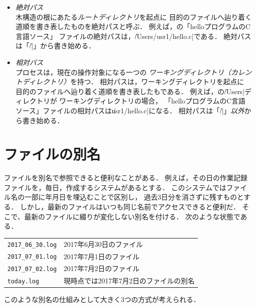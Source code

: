 \begin{itemize}
\item \emph{絶対パス} \\
  木構造の根にあたる\emph{ルートディレクトリ}を起点に
  目的のファイルへ辿り着く道順を書き表したものを絶対パスと呼ぶ．
  例えば，の「helloプログラムのC言語ソース」
  ファイルの絶対パスは，\|/Users/usr1/hello.c|である．
  絶対パスは「\|/|」から書き始める．

\item \emph{相対パス} \\
  プロセスは，現在の操作対象になる一つの
  \emph{ワーキングディレクトリ（カレントディレクトリ）}を持つ．
  相対パスは，ワーキングディレクトリを起点に
  目的のファイルへ辿り着く道順を書き表したもである．
  例えば，の\|/Users|ディレクトリが
  ワーキングディレクトリの場合，
  「helloプログラムのC言語ソース」ファイルの相対パスは\|usr1/hello.c|になる．
  相対パスは「\|/|」\emph{以外}から書き始める．
\end{itemize}

\section{ファイルの別名}
ファイルを別名で参照できると便利なことがある．
例えば，その日の作業記録ファイルを，毎日，作成するシステムがあるとする．
このシステムではファイル名の一部に年月日を埋込むことで区別し，
過去3日分を消さずに残すものとする．
しかし，最新のファイルはいつも同じ名前でアクセスできると便利だ．
そこで、最新のファイルに綴りが変化しない別名を付ける．
次のような状態である．

\begin{center}
  \begin{tabular}{l l}
    \texttt{2017\_06\_30.log}   & 2017年6月30日のファイル \\
    \texttt{2017\_07\_01.log}   & 2017年7月1日のファイル  \\
    \texttt{2017\_07\_02.log}   & 2017年7月2日のファイル  \\
    \texttt{today.log}          & 現時点では2017年7月2日のファイルの別名
  \end{tabular}
\end{center}

このような別名の仕組みとして大きく3つの方式が考えられる．

